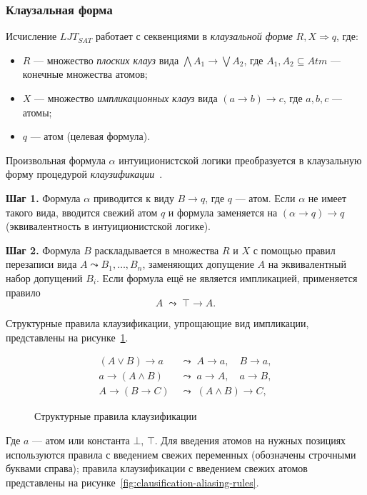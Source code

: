 \documentclass[14pt, russian]{scrartcl}
\begin{document}
\subsubsection{Клаузальная форма}

Исчисление $LJT_{SAT}$ работает с секвенциями в \emph{клаузальной форме}
$R, X \Rightarrow q$, где:
\begin{itemize}
\item $R$ --- множество \emph{плоских клауз} вида $\bigwedge A_1 \rightarrow
  \bigvee A_2$, где $A_1, A_2 \subseteq \mathit{Atm}$ --- конечные множества
  атомов;
\item $X$ --- множество \emph{импликационных клауз} вида $(a \rightarrow b)
  \rightarrow c$, где $a, b, c$ --- атомы;
\item $q$ --- атом (целевая формула).
\end{itemize}

Произвольная формула $\alpha$ интуиционистской логики преобразуется в
клаузальную форму процедурой \emph{клаузификации}~\cite{ClaessenRosen2015}.

\textbf{Шаг 1.} Формула $\alpha$ приводится к виду $B \rightarrow q$, где $q$ ---
атом. Если $\alpha$ не имеет такого вида, вводится свежий атом $q$ и формула
заменяется на $(\alpha \rightarrow q) \rightarrow q$ (эквивалентность в
интуиционистской логике).

\textbf{Шаг 2.} Формула $B$ раскладывается в множества $R$ и $X$ с помощью
правил перезаписи вида $A \leadsto B_1, \ldots, B_n$, заменяющих допущение $A$
на эквивалентный набор допущений $B_i$. Если формула ещё не является импликацией,
применяется правило
\[
A \;\leadsto\; \top \rightarrow A.
\]

Структурные правила клаузификации, упрощающие вид импликации, представлены на рисунке~\ref{fig:clausification-structural-rules}.
\begin{figure}[!htb]
\centering
\vspace*{-3ex}
\begin{align*}
(A \lor B) \rightarrow a &\;\leadsto\; A \rightarrow a,\quad B \rightarrow a, \\
a \rightarrow (A \land B) &\;\leadsto\; a \rightarrow A,\quad a \rightarrow B, \\
A \rightarrow (B \rightarrow C) &\;\leadsto\; (A \land B) \rightarrow C,
\end{align*}
\caption{Структурные правила клаузификации}
\label{fig:clausification-structural-rules}
\end{figure}
Где $a$ --- атом или константа $\bot$, $\top$. Для введения атомов на нужных
позициях используются правила с введением свежих переменных (обозначены строчными
буквами справа); правила клаузификации с введением свежих атомов представлены на рисунке~\ref{fig:clausification-aliasing-rules}.
\end{document}
